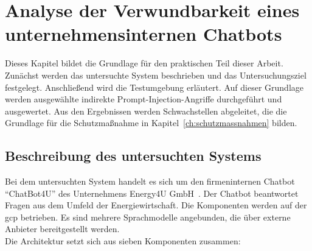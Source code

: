 \chapter{Analyse der Verwundbarkeit eines unternehmensinternen Chatbots}\label{ch:methodik}

Dieses Kapitel bildet die Grundlage für den praktischen Teil dieser Arbeit. Zunächst werden das untersuchte System beschrieben und das Untersuchungsziel festgelegt.
Anschließend wird die Testumgebung erläutert. Auf dieser Grundlage werden ausgewählte indirekte Prompt-Injection-Angriffe durchgeführt und ausgewertet. Aus den
Ergebnissen werden Schwachstellen abgeleitet, die die Grundlage für die Schutzmaßnahme in Kapitel~\ref{ch:schutzmassnahmen} bilden.

\section{Beschreibung des untersuchten Systems}\label{system}

Bei dem untersuchten System handelt es sich um den firmeninternen Chatbot \enquote{ChatBot4U} des Unternehmens Energy4U GmbH~\cite{an17}.
Der Chatbot beantwortet Fragen aus dem Umfeld der Energiewirtschaft. Die Komponenten werden auf der \ac{gcp} betrieben. Es 
sind mehrere Sprachmodelle angebunden, die über externe Anbieter bereitgestellt werden. \\
Die Architektur setzt sich aus sieben Komponenten zusammen:

